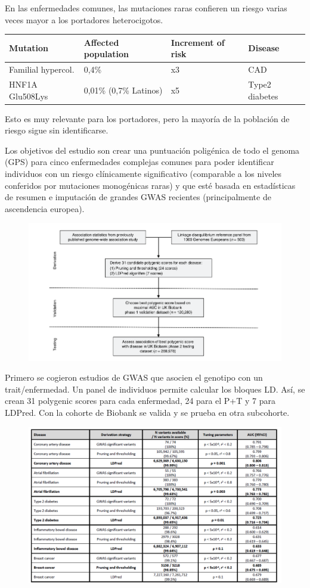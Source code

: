 En las enfermedades comunes, las mutaciones raras confieren un riesgo varias veces mayor a los portadores heterocigotos. 
\begin{table}[htbp]
\begin{tabular}{l l l l}
Mutation & Affected population & Increment of risk & Disease \\ \hline
Familial hypercol. & 0,4\% & x3 & CAD \\
HNF1A Glu508Lys & 0,01\% (0,7\% Latinos) & x5 & Type2 diabetes
\end{tabular}
\end{table}

Esto es muy relevante para los portadores, pero la mayoría de la población de riesgo sigue sin identificarse.

Los objetivos del estudio son crear una puntuación poligénica de todo el genoma (GPS) para cinco enfermedades complejas comunes para poder identificar individuos con un riesgo clínicamente significativo (comparable a los niveles conferidos por mutaciones monogénicas raras) y que esté basada en estadísticas de resumen e imputación de grandes GWAS recientes (principalmente de ascendencia europea).

\begin{figure}[htbp]
\centering
\includegraphics[width = 0.8 \textwidth]{figs/Imagen4.png}
\end{figure}

\newpage
Primero se cogieron estudios de GWAS que asocien el genotipo con un trait/enfermedad. Un panel de individuos permite calcular los bloques LD. Así, se crean 31 polygenic scores para cada enfermedad, 24 para el P+T y 7 para LDPred. Con la cohorte de Biobank se valida y se prueba en otra subcohorte. 

\begin{figure}[htbp]
\centering
\includegraphics[width = 0.8 \textwidth]{figs/Imagen5.png}
\end{figure}

